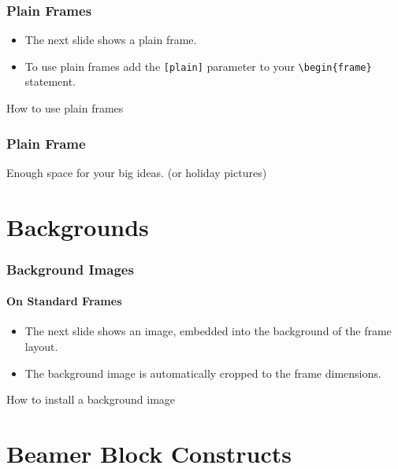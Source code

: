\begin{frame}[fragile]
        \frametitle{Plain Frames}
        \begin{itemize}
      \item The next slide shows a plain frame.
      \item To use plain frames add the \verb![plain]! parameter to your \verb!\begin{frame}! statement.
    \end{itemize}
        \begin{block}{How to use plain frames}
    \scriptsize
    
        \end{block}
\end{frame}

%

\begin{frame}[c,plain]
        \frametitle{Plain Frame}
        \begin{center}
                {\tiny Enough} {\scriptsize space} for {\Large your} {\huge big} {\Huge ideas.} {\TINY (or holiday pictures)}
        \end{center}
\end{frame}

\section{Backgrounds}
\begin{frame}[fragile]
    \frametitle{Background Images}
    \framesubtitle{On Standard Frames}
    \begin{itemize}
      \item The next slide shows an image, embedded into the background of the frame layout.
      \item The background image is automatically cropped to the frame dimensions.
    \end{itemize}
    \begin{block}{How to install a background image}
        \scriptsize
        
    \end{block}
\end{frame}



\section{Beamer Block Constructs}
